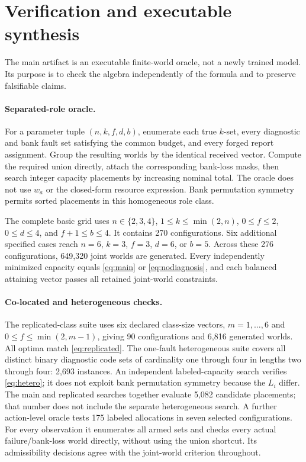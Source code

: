 \section{Verification and executable synthesis}
\label{sec:verification}
The main artifact is an executable finite-world oracle, not a newly trained model. Its purpose is to check the algebra independently of the formula and to preserve falsifiable claims.

\paragraph{Separated-role oracle.}
For a parameter tuple $(n,k,f,d,b)$, enumerate each true $k$-set, every diagnostic and bank fault set satisfying the common budget, and every forged report assignment. Group the resulting worlds by the identical received vector. Compute the required union directly, attach the corresponding bank-loss masks, then search integer capacity placements by increasing nominal total. The oracle does not use $w_a$ or the closed-form resource expression. Bank permutation symmetry permits sorted placements in this homogeneous role class.

The complete basic grid uses $n\in\{2,3,4\}$, $1\leq k\leq\min(2,n)$, $0\leq f\leq2$, $0\leq d\leq4$, and $f+1\leq b\leq4$. It contains 270 configurations. Six additional specified cases reach $n=6$, $k=3$, $f=3$, $d=6$, or $b=5$. Across these 276 configurations, 649,320 joint worlds are generated. Every independently minimized capacity equals \cref{eq:main} or \cref{eq:nodiagnosis}, and each balanced attaining vector passes all retained joint-world constraints.

\paragraph{Co-located and heterogeneous checks.}
The replicated-class suite uses six declared class-size vectors, $m=1,\ldots,6$ and $0\leq f\leq\min(2,m-1)$, giving 90 configurations and 6,816 generated worlds. All optima match \cref{eq:replicated}. The one-fault heterogeneous suite covers all distinct binary diagnostic code sets of cardinality one through four in lengths two through four: 2,693 instances. An independent labeled-capacity search verifies \cref{eq:hetero}; it does not exploit bank permutation symmetry because the $L_i$ differ. The main and replicated searches together evaluate 5,082 candidate placements; that number does not include the separate heterogeneous search. A further action-level oracle tests 175 labeled allocations in seven selected configurations. For every observation it enumerates all armed sets and checks every actual failure/bank-loss world directly, without using the union shortcut. Its admissibility decisions agree with the joint-world criterion throughout.

